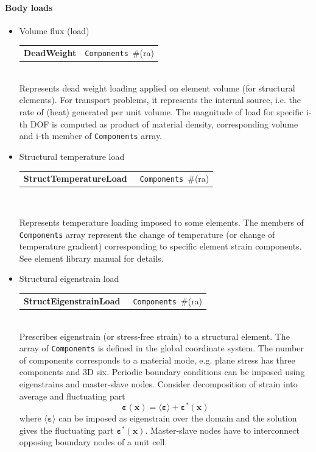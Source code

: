 \documentclass[a4paper]{article}
\makeatletter
\newcommand{\vect}[1]{\boldsymbol{#1}} %
\newcommand{\tens}[1]{\boldsymbol{#1}} %
\newcommand{\strain}{\varepsilon}
\newcommand{\param}[1]{\texttt{#1}} %
\newcommand{\field}[2]{\param{#1}~\#{\tiny(#2)}} %
\newcommand{\entKeywordInst}[1]{\textbf{#1}} %
\newenvironment{record}[1][]{\begin{tabular}{|ll}}{\end{tabular}\\}
\newcommand{\recentry}[2]{{#1}&{#2}\\}
\newcounter{rcc}
\newenvironment{record}[1][\textwidth]{\setcounter{rcc}{0}\begin{tabular*}{#1}{|ll@{\extracolsep{\fill}}r}}{\end{tabular*}\\}
\newcommand{\recentry}[2]{\ifthenelse{\value{rcc}>0}{&$\backslash$ \\}{\setcounter{rcc}{1}}{#1}&{#2}}
\makeatother
\begin{document}
\paragraph{Body loads}
\begin{itemize}
\item Volume flux (load)

\noindent
\begin{record}[0.9\textwidth]
  \recentry{\entKeywordInst{DeadWeight}}{\field{Components}{ra}}
\end{record}
Represents dead weight loading applied on element volume (for
structural elements). For transport problems, it represents the
internal source, i.e. the rate of (heat) generated per unit volume.
The magnitude of load for specific i-th DOF is computed as product of material density,
corresponding volume and i-th member of \param{Components} array.
\item Structural temperature load

\noindent
\begin{record}[0.9\textwidth]
  \recentry{\entKeywordInst{StructTemperatureLoad}~}{\field{Components}{ra}}
\end{record}

Represents temperature loading imposed to some elements. The members of
\param{Components} array represent the change of temperature (or change
of temperature gradient) corresponding to
specific element strain components. See element library manual for details.

\item Structural eigenstrain load

\noindent
\begin{record}[0.9\textwidth]
  \recentry{\entKeywordInst{StructEigenstrainLoad}~}{\field{Components}{ra}}
\end{record}
Prescribes eigenstrain (or stress-free strain) to a structural element. The array of \param{Components} is defined in the global coordinate system. The number of components corresponds to a material mode, e.g. plane stress has three components and 3D six. Periodic boundary conditions can be imposed using eigenstrains and master-slave nodes. Consider decomposition of strain into average and fluctuating part
\begin{equation}
\tens{\strain}(\vect{x}) = \langle \tens{\strain} \rangle + \tens{\strain}^*(\vect{x})
\end{equation}
where $\langle \tens{\strain} \rangle$ can be imposed as eigenstrain over the domain and the solution gives the fluctuating part $\tens{\strain}^*(\vect{x})$. Master-slave nodes have to interconnect opposing boundary nodes of a unit cell.


\end{itemize}
\end{document}
